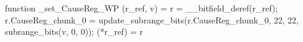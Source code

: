 function _set_CauseReg_WP (r_ref, v) = {
    r = __bitfield_deref(r_ref);
    r.CauseReg_chunk_0 = update_subrange_bits(r.CauseReg_chunk_0, 22, 22, subrange_bits(v, 0, 0));
    (*r_ref) = r
}
